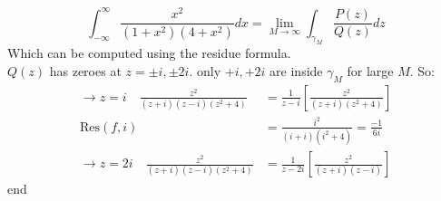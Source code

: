 \begin{example}
    \begin{equation*}
        \int_{-\infty}^{\infty} \frac{x^2}{(1 + x^2)(4 + x^2)} dx = \lim_{M \to \infty} \int_{\gamma_M} \frac{P(z)}{Q(z)} dz
    \end{equation*}
    Which can be computed using the residue formula. \\
    $Q(z)$ has zeroes at $z = \pm i, \pm 2i$. only $+i, +2i$ are inside $\gamma_M$ for large $M$. So:
    \begin{align*}
        \rightarrow \boxed{z = i} \quad \frac{z^2}{(z + i)(z-i)(z^2 + 4)}  & = \frac{1}{z - i}\left[\frac{z^2}{(z + i)(z^2 + 4)}\right] \\
        \text{Res}(f, i)                                                   & = \frac{i^2}{(i + i)(i^2 + 4)} = \frac{-1}{6i}             \\
        \rightarrow \boxed{z = 2i} \quad \frac{z^2}{(z + i)(z-i)(z^2 + 4)} & = \frac{1}{z - 2i}\left[\frac{z^2}{(z + i)(z - i)}\right]
    \end{align*}
    end
\end{example}